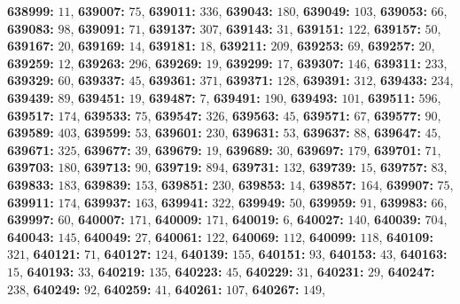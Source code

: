 \textsf{\bfseries 638999:} $11$, \textsf{\bfseries 639007:} $75$, \textsf{\bfseries 639011:} $336$, \textsf{\bfseries 639043:} $180$, \textsf{\bfseries 639049:} $103$, \textsf{\bfseries 639053:} $66$, \textsf{\bfseries 639083:} $98$, \textsf{\bfseries 639091:} $71$, \textsf{\bfseries 639137:} $307$, \textsf{\bfseries 639143:} $31$, \textsf{\bfseries 639151:} $122$, \textsf{\bfseries 639157:} $50$, \textsf{\bfseries 639167:} $20$, \textsf{\bfseries 639169:} $14$, \textsf{\bfseries 639181:} $18$, \textsf{\bfseries 639211:} $209$, \textsf{\bfseries 639253:} $69$, \textsf{\bfseries 639257:} $20$, \textsf{\bfseries 639259:} $12$, \textsf{\bfseries 639263:} $296$, \textsf{\bfseries 639269:} $19$, \textsf{\bfseries 639299:} $17$, \textsf{\bfseries 639307:} $146$, \textsf{\bfseries 639311:} $233$, \textsf{\bfseries 639329:} $60$, \textsf{\bfseries 639337:} $45$, \textsf{\bfseries 639361:} $371$, \textsf{\bfseries 639371:} $128$, \textsf{\bfseries 639391:} $312$, \textsf{\bfseries 639433:} $234$, \textsf{\bfseries 639439:} $89$, \textsf{\bfseries 639451:} $19$, \textsf{\bfseries 639487:} $7$, \textsf{\bfseries 639491:} $190$, \textsf{\bfseries 639493:} $101$, \textsf{\bfseries 639511:} $596$, \textsf{\bfseries 639517:} $174$, \textsf{\bfseries 639533:} $75$, \textsf{\bfseries 639547:} $326$, \textsf{\bfseries 639563:} $45$, \textsf{\bfseries 639571:} $67$, \textsf{\bfseries 639577:} $90$, \textsf{\bfseries 639589:} $403$, \textsf{\bfseries 639599:} $53$, \textsf{\bfseries 639601:} $230$, \textsf{\bfseries 639631:} $53$, \textsf{\bfseries 639637:} $88$, \textsf{\bfseries 639647:} $45$, \textsf{\bfseries 639671:} $325$, \textsf{\bfseries 639677:} $39$, \textsf{\bfseries 639679:} $19$, \textsf{\bfseries 639689:} $30$, \textsf{\bfseries 639697:} $179$, \textsf{\bfseries 639701:} $71$, \textsf{\bfseries 639703:} $180$, \textsf{\bfseries 639713:} $90$, \textsf{\bfseries 639719:} $894$, \textsf{\bfseries 639731:} $132$, \textsf{\bfseries 639739:} $15$, \textsf{\bfseries 639757:} $83$, \textsf{\bfseries 639833:} $183$, \textsf{\bfseries 639839:} $153$, \textsf{\bfseries 639851:} $230$, \textsf{\bfseries 639853:} $14$, \textsf{\bfseries 639857:} $164$, \textsf{\bfseries 639907:} $75$, \textsf{\bfseries 639911:} $174$, \textsf{\bfseries 639937:} $163$, \textsf{\bfseries 639941:} $322$, \textsf{\bfseries 639949:} $50$, \textsf{\bfseries 639959:} $91$, \textsf{\bfseries 639983:} $66$, \textsf{\bfseries 639997:} $60$, \textsf{\bfseries 640007:} $171$, \textsf{\bfseries 640009:} $171$, \textsf{\bfseries 640019:} $6$, \textsf{\bfseries 640027:} $140$, \textsf{\bfseries 640039:} $704$, \textsf{\bfseries 640043:} $145$, \textsf{\bfseries 640049:} $27$, \textsf{\bfseries 640061:} $122$, \textsf{\bfseries 640069:} $112$, \textsf{\bfseries 640099:} $118$, \textsf{\bfseries 640109:} $321$, \textsf{\bfseries 640121:} $71$, \textsf{\bfseries 640127:} $124$, \textsf{\bfseries 640139:} $155$, \textsf{\bfseries 640151:} $93$, \textsf{\bfseries 640153:} $43$, \textsf{\bfseries 640163:} $15$, \textsf{\bfseries 640193:} $33$, \textsf{\bfseries 640219:} $135$, \textsf{\bfseries 640223:} $45$, \textsf{\bfseries 640229:} $31$, \textsf{\bfseries 640231:} $29$, \textsf{\bfseries 640247:} $238$, \textsf{\bfseries 640249:} $92$, \textsf{\bfseries 640259:} $41$, \textsf{\bfseries 640261:} $107$, \textsf{\bfseries 640267:} $149$, 
